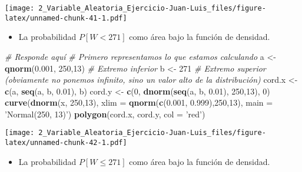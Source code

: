 \documentclass[
]{article}
\newenvironment{Shaded}{\begin{snugshade}}{\end{snugshade}}
\newcommand{\CommentTok}[1]{\textcolor[rgb]{0.56,0.35,0.01}{\textit{#1}}}
\newcommand{\DataTypeTok}[1]{\textcolor[rgb]{0.13,0.29,0.53}{#1}}
\newcommand{\DecValTok}[1]{\textcolor[rgb]{0.00,0.00,0.81}{#1}}
\newcommand{\FloatTok}[1]{\textcolor[rgb]{0.00,0.00,0.81}{#1}}
\newcommand{\KeywordTok}[1]{\textcolor[rgb]{0.13,0.29,0.53}{\textbf{#1}}}
\newcommand{\NormalTok}[1]{#1}
\newcommand{\StringTok}[1]{\textcolor[rgb]{0.31,0.60,0.02}{#1}}
\providecommand{\tightlist}{%
  \setlength{\itemsep}{0pt}\setlength{\parskip}{0pt}}
\begin{document}
\texttt{[image: 2\_Variable\_Aleatoria\_Ejercicio-Juan-Luis\_files/figure-latex/unnamed-chunk-41-1.pdf]}

\begin{itemize}
\tightlist
\item
  La probabilidad \(P [W < 271]\) como área bajo la función de densidad.
\end{itemize}

\begin{Shaded}
\begin{Highlighting}[]
\CommentTok{# Responde aquí}
\CommentTok{# Primero representamos lo que estamos calculando}
\NormalTok{a <-}\StringTok{ }\KeywordTok{qnorm}\NormalTok{(}\FloatTok{0.001}\NormalTok{, }\DecValTok{250}\NormalTok{,}\DecValTok{13}\NormalTok{) }\CommentTok{# Extremo inferior}
\NormalTok{b <-}\StringTok{ }\DecValTok{271} \CommentTok{# Extremo superior (obviamente no ponemos infinito, sino un valor alto de la distribución)}
\NormalTok{cord.x <-}\StringTok{ }\KeywordTok{c}\NormalTok{(a, }\KeywordTok{seq}\NormalTok{(a, b, }\FloatTok{0.01}\NormalTok{), b) }
\NormalTok{cord.y <-}\StringTok{ }\KeywordTok{c}\NormalTok{(}\DecValTok{0}\NormalTok{, }\KeywordTok{dnorm}\NormalTok{(}\KeywordTok{seq}\NormalTok{(a, b, }\FloatTok{0.01}\NormalTok{), }\DecValTok{250}\NormalTok{,}\DecValTok{13}\NormalTok{), }\DecValTok{0}\NormalTok{) }
\KeywordTok{curve}\NormalTok{(}\KeywordTok{dnorm}\NormalTok{(x, }\DecValTok{250}\NormalTok{,}\DecValTok{13}\NormalTok{), }\DataTypeTok{xlim =} \KeywordTok{qnorm}\NormalTok{(}\KeywordTok{c}\NormalTok{(}\FloatTok{0.001}\NormalTok{, }\FloatTok{0.999}\NormalTok{),}\DecValTok{250}\NormalTok{,}\DecValTok{13}\NormalTok{), }\DataTypeTok{main =} \StringTok{'Normal(250, 13)'}\NormalTok{) }
\KeywordTok{polygon}\NormalTok{(cord.x, cord.y, }\DataTypeTok{col =} \StringTok{'red'}\NormalTok{)}
\end{Highlighting}
\end{Shaded}

\texttt{[image: 2\_Variable\_Aleatoria\_Ejercicio-Juan-Luis\_files/figure-latex/unnamed-chunk-42-1.pdf]}

\begin{itemize}
\tightlist
\item
  La probabilidad \(P [W \leq 271]\) como área bajo la función de
  densidad.
\end{itemize}
\end{document}
